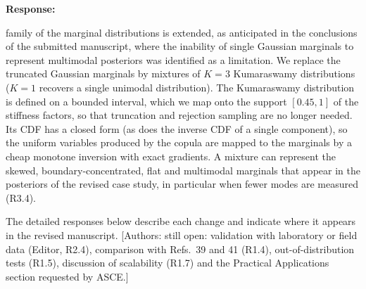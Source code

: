 \documentclass[11pt]{article}
\newenvironment{response}{\par\smallskip\noindent\color{resp}\textbf{Response:}\ }{\par}
\newcommand{\authornote}[1]{\textcolor{note}{\textsf{[Authors: #1]}}}
\begin{document}
\begin{response}
\begin{enumerate}[leftmargin=*]
family of the marginal distributions is extended, as anticipated in the conclusions of the submitted manuscript, where
the inability of single Gaussian marginals to represent multimodal posteriors was identified as a limitation. We
replace the truncated Gaussian marginals by mixtures of $K=3$ Kumaraswamy distributions ($K=1$ recovers a single
unimodal distribution). The Kumaraswamy distribution is defined on a bounded interval, which we map onto the support
$[0.45,1]$ of the stiffness factors, so that truncation and rejection sampling are no longer needed. Its CDF has a
closed form (as does the inverse CDF of a single component), so the uniform variables produced by the copula are mapped
to the marginals by a cheap monotone inversion with exact gradients. A mixture can represent the skewed,
boundary-concentrated, flat and multimodal marginals that appear in the posteriors of the revised case study, in
particular when fewer modes are measured (R3.4).
\end{enumerate}
The detailed responses below describe each change and indicate where it appears in the revised manuscript.
\authornote{still open: validation with laboratory or field data (Editor, R2.4), comparison with Refs.~39 and 41
(R1.4), out-of-distribution tests (R1.5), discussion of scalability (R1.7) and the Practical Applications section
requested by ASCE.}
\end{response}
\end{document}

